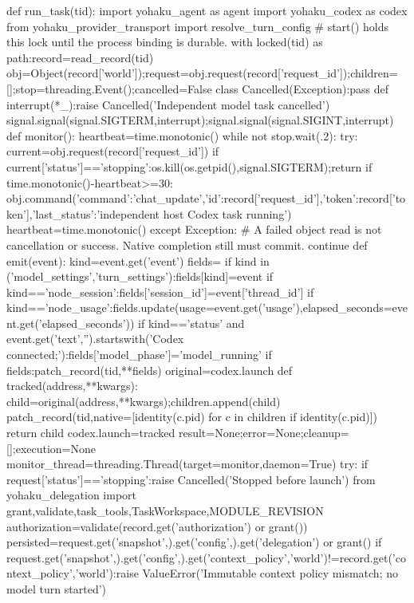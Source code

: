 def run_task(tid):
    import yohaku_agent as agent
    import yohaku_codex as codex
    from yohaku_provider_transport import resolve_turn_config
    # start() holds this lock until the process binding is durable.
    with locked(tid) as path:record=read_record(tid)
    obj=Object(record['world']);request=obj.request(record['request_id']);children=[];stop=threading.Event();cancelled=False
    class Cancelled(Exception):pass
    def interrupt(*_):raise Cancelled('Independent model task cancelled')
    signal.signal(signal.SIGTERM,interrupt);signal.signal(signal.SIGINT,interrupt)
    def monitor():
        heartbeat=time.monotonic()
        while not stop.wait(.2):
            try:
                current=obj.request(record['request_id'])
                if current['status']=='stopping':os.kill(os.getpid(),signal.SIGTERM);return
                if time.monotonic()-heartbeat>=30:
                    obj.command({'command':'chat_update','id':record['request_id'],'token':record['token'],'last_status':'independent host Codex task running'})
                    heartbeat=time.monotonic()
            except Exception:
                # A failed object read is not cancellation or success. Native completion still must commit.
                continue
    def emit(event):
        kind=event.get('event')
        fields={}
        if kind in ('model_settings','turn_settings'):fields[kind]=event
        if kind=='node_session':fields['session_id']=event['thread_id']
        if kind=='node_usage':fields.update(usage=event.get('usage'),elapsed_seconds=event.get('elapsed_seconds'))
        if kind=='status' and event.get('text','').startswith('Codex connected;'):fields['model_phase']='model_running'
        if fields:patch_record(tid,**fields)
    original=codex.launch
    def tracked(address,**kwargs):
        child=original(address,**kwargs);children.append(child)
        patch_record(tid,native=[identity(c.pid) for c in children if identity(c.pid)])
        return child
    codex.launch=tracked
    result=None;error=None;cleanup=[];execution=None
    monitor_thread=threading.Thread(target=monitor,daemon=True)
    try:
        if request['status']=='stopping':raise Cancelled('Stopped before launch')
        from yohaku_delegation import grant,validate,task_tools,TaskWorkspace,MODULE_REVISION
        authorization=validate(record.get('authorization') or grant())
        persisted=request.get('snapshot',{}).get('config',{}).get('delegation') or grant()
        if request.get('snapshot',{}).get('config',{}).get('context_policy','world')!=record.get('context_policy','world'):raise ValueError('Immutable context policy mismatch; no model turn started')
